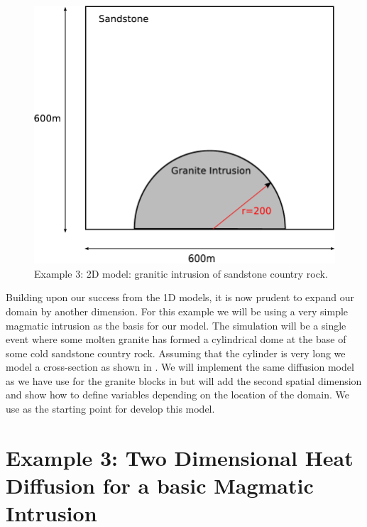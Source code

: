 
%
%
%

\begin{figure}[t]
\centerline{\includegraphics[width=4.in]{figures/twodheatdiff}}
\caption{Example 3: 2D model: granitic intrusion of sandstone country rock.}
\label{fig:twodhdmodel}
\end{figure}


Building upon our success from the 1D models, it is now prudent to expand our domain by another dimension. 
For this example we will be using a very simple magmatic intrusion as the basis for our model. The simulation will be a single event where some molten granite has formed a cylindrical dome at the base of some cold sandstone country rock. Assuming that the cylinder is very long 
we model a cross-section as shown in . We will implement the same 
diffusion model as we have use for the granite blocks in 
but will add the second spatial dimension and show how to define 
variables depending on the location of the domain. 
We use  as the starting point for develop this model. 

\section{Example 3: Two Dimensional Heat Diffusion for a basic Magmatic Intrusion}
\label{Sec:2DHD}

